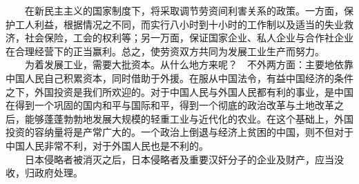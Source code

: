 \documentclass[cn,11pt,chinese]{elegantbook}
\begin{document}
　　在新民主主义的国家制度下，将采取调节劳资间利害关系的政策。一方面，保护工人利益，根据情况之不同，而实行八小时到十小时的工作制以及适当的失业救济，社会保险，工会的权利等；另一万面，保证国家企业、私人企业与合作社企业在合理经营下的正当赢利。总之，使劳资双方共同为发展工业生产而努力。\\
　　为着发展工业，需要大批资本。从什么地方来呢？　不外两方面：主要地依靠中国人民自己积累资本，同时借助于外援。在服从中国法令，有益中国经济的条件之下，外国投资是我们所欢迎的。对于中国人民与外国人民都有利的事业，是中国在得到一个巩固的国内和平与国际和平，得到一个彻底的政治改革与土地改革之后，能够蓬蓬勃勃地发展大规模的轻重工业与近代化的农业。在这个基础上，外国投资的容纳量将是产常广大的。一个政治上倒退与经济上贫困的中国，则不但对于中国人民非常不利，对于外国人民也是不利的。\\
　　日本侵略者被消灭之后，日本侵略者及重要汉奸分子的企业及财产，应当没收，归政府处理。\\
\end{document}
